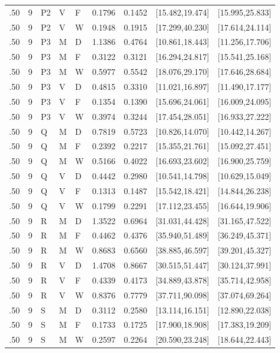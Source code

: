 {\begin{longtable}{rrlllrrll}
.50 & 9 & P2 & V & F & 0.1796 & 0.1452 & [15.482,19.474] & [15.995,25.833]\\
.50 & 9 & P2 & V & W & 0.1948 & 0.1915 & [17.299,40.230] & [17.614,24.114]\\
.50 & 9 & P3 & M & D & 1.1386 & 0.4764 & [10.861,18.443] & [11.256,17.706]\\
.50 & 9 & P3 & M & F & 0.3122 & 0.3121 & [16.294,24.817] & [15.541,25.168]\\
.50 & 9 & P3 & M & W & 0.5977 & 0.5542 & [18.076,29.170] & [17.646,28.684]\\
.50 & 9 & P3 & V & D & 0.4815 & 0.3310 & [11.021,16.897] & [11.490,17.177]\\
.50 & 9 & P3 & V & F & 0.1354 & 0.1390 & [15.696,24.061] & [16.009,24.095]\\
.50 & 9 & P3 & V & W & 0.3974 & 0.3244 & [17.454,28.051] & [16.933,27.222]\\
.50 & 9 & Q & M & D & 0.7819 & 0.5723 & [10.826,14.070] & [10.442,14.267]\\
.50 & 9 & Q & M & F & 0.2392 & 0.2217 & [15.355,21.761] & [15.092,27.451]\\
.50 & 9 & Q & M & W & 0.5166 & 0.4022 & [16.693,23.602] & [16.900,25.759]\\
.50 & 9 & Q & V & D & 0.4442 & 0.2980 & [10.541,14.798] & [10.629,15.049]\\
.50 & 9 & Q & V & F & 0.1313 & 0.1487 & [15.542,18.421] & [14.844,26.238]\\
.50 & 9 & Q & V & W & 0.1799 & 0.2291 & [17.112,23.455] & [16.644,19.906]\\
.50 & 9 & R & M & D & 1.3522 & 0.6964 & [31.031,44.428] & [31.165,47.522]\\
.50 & 9 & R & M & F & 0.4462 & 0.4376 & [35.940,51.489] & [36.249,45.371]\\
.50 & 9 & R & M & W & 0.8683 & 0.6560 & [38.885,46.597] & [39.201,45.327]\\
.50 & 9 & R & V & D & 1.4708 & 0.8667 & [30.515,51.447] & [30.124,37.991]\\
.50 & 9 & R & V & F & 0.4339 & 0.4173 & [34.889,43.878] & [35.714,42.958]\\
.50 & 9 & R & V & W & 0.8376 & 0.7779 & [37.711,90.098] & [37.074,69.264]\\
.50 & 9 & S & M & D & 0.3112 & 0.2580 & [13.114,16.151] & [12.890,22.038]\\
.50 & 9 & S & M & F & 0.1733 & 0.1725 & [17.900,18.908] & [17.383,19.209]\\
.50 & 9 & S & M & W & 0.2597 & 0.2264 & [20.590,23.248] & [18.644,22.443]\\

\end{longtable}}
